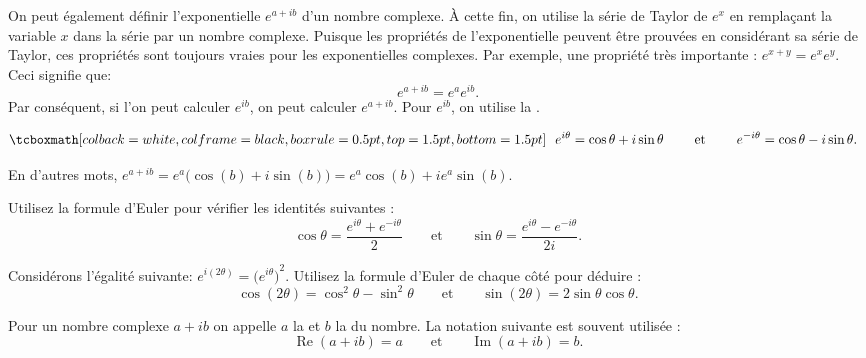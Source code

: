 \pagebreak[2]
On peut également définir l'exponentielle $e^{a+ib}$ d'un nombre complexe. À cette fin, on utilise la série de Taylor de $e^x$ en remplaçant la variable $x$ dans la série par un nombre complexe. Puisque les propriétés de l'exponentielle peuvent être prouvées en considérant sa série de Taylor, ces propriétés sont toujours vraies pour les exponentielles complexes.  Par exemple, une propriété très importante :   $e^{x+y} = e^x e^y$.  Ceci signifie que: 
\begin{equation*}
e^{a+ib} = e^a e^{ib}.
\end{equation*}
Par conséquent, si l'on peut  calculer $e^{ib}$, on peut calculer $e^{a+ib}$.  Pour $e^{ib}$, on utilise la 
\emph{}.

\begin{theorem} \label{eulersformula}
\begin{equation*}
\mybxbg{~~
e^{i \theta} = \cos \theta + i \sin \theta
\qquad \text{ et } \qquad
e^{- i \theta} = \cos \theta - i \sin \theta .
~~}
\end{equation*}
\end{theorem}

En d'autres mots, $e^{a+ib} = e^a \bigl( \cos(b) + i \sin(b) \bigr) = e^a \cos(b) + i e^a \sin(b)$.

\begin{exercise}
Utilisez la formule d'Euler pour vérifier les identités suivantes : 
\begin{equation*}
\cos \theta = \frac{e^{i \theta} + e^{-i \theta}}{2}
\qquad \text{et} \qquad
\sin \theta = \frac{e^{i \theta} - e^{-i \theta}}{2i}.
\end{equation*}
\end{exercise}

\begin{exercise}
Considérons l'égalité suivante: $e^{i(2\theta)} = {\bigl(e^{i \theta} \bigr)}^2$.  Utilisez la formule d'Euler de chaque côté pour déduire :
\begin{equation*}
\cos (2\theta) = \cos^2 \theta - \sin^2 \theta
\qquad \text{et} \qquad
\sin (2\theta) = 2 \sin \theta \cos \theta .
\end{equation*}
\end{exercise}

Pour un nombre complexe $a+ib$ on appelle
$a$ la \emph{} et $b$ la \emph{} du nombre.
La notation suivante est souvent utilisée : 
\begin{equation*}
\operatorname{Re}(a+ib) = a
\qquad \text{et} \qquad
\operatorname{Im}(a+ib) = b.
\end{equation*}


